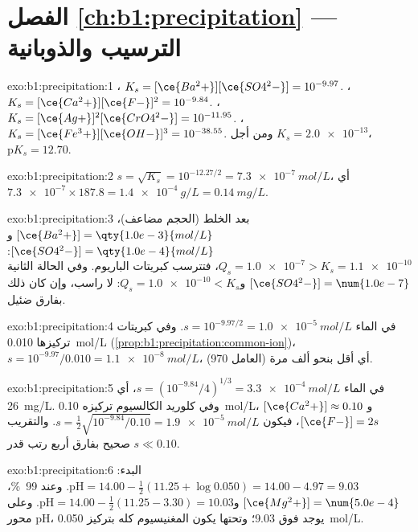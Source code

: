 \section*{الفصل \ref{ch:b1:precipitation} --- الترسيب والذوبانية}

\begin{solution}{exo:b1:precipitation:1}
، $K_s = [\ce{Ba^2+}][\ce{SO4^2-}] =
10^{-9.97}$. ، $K_s = [\ce{Ca^2+}][\ce{F-}]^2 =
10^{-9.84}$. ، $K_s =
[\ce{Ag+}]^2[\ce{CrO4^2-}] = 10^{-11.95}$. ،
$K_s = [\ce{Fe^3+}][\ce{OH-}]^3 = 10^{-38.55}$. ومن أجل $K_s = \num{2.0e-13}$،
$\mathrm{p}K_s = 12.70$.
\end{solution}

\begin{solution}{exo:b1:precipitation:2}
$s = \sqrt{K_s} = 10^{-12.27/2} = \qty{7.3e-7}{mol/L}$، أي
$\num{7.3e-7} \times 187.8 = \qty{1.4e-4}{g/L} = \qty{0.14}{mg/L}$.
\end{solution}

\begin{solution}{exo:b1:precipitation:3}
بعد الخلط (الحجم مضاعف)، $[\ce{Ba^2+}] = \qty{1.0e-3}{mol/L}$
و$[\ce{SO4^2-}] = \qty{1.0e-4}{mol/L}$: $Q_s = \num{1.0e-7} > K_s =
\num{1.1e-10}$، فتترسب كبريتات الباريوم. وفي الحالة الثانية
$[\ce{SO4^2-}] = \num{1.0e-7}$ و$Q_s = \num{1.0e-10} < K_s$: لا
راسب، وإن كان ذلك بفارق ضئيل.
\end{solution}

\begin{solution}{exo:b1:precipitation:4}
في الماء $s = 10^{-9.97/2} = \qty{1.0e-5}{mol/L}$. وفي كبريتات تركيزها \qty{0.010}{mol/L}
(\cref{prop:b1:precipitation:common-ion})، $s = 10^{-9.97}/0.010 =
\qty{1.1e-8}{mol/L}$، أي أقل بنحو ألف مرة (العامل 970).
\end{solution}

\begin{solution}{exo:b1:precipitation:5}
في الماء $s = (10^{-9.84}/4)^{1/3} = \qty{3.3e-4}{mol/L}$، أي
\qty{26}{mg/L}. وفي كلوريد الكالسيوم تركيزه \qty{0.10}{mol/L}،
$[\ce{Ca^2+}] \approx 0.10$ و$[\ce{F-}] = 2s$، فيكون
$s = \frac12\sqrt{10^{-9.84}/0.10} = \qty{1.9e-5}{mol/L}$.
والتقريب $s \ll 0.10$ صحيح بفارق أربع رتب قدر.
\end{solution}

\begin{solution}{exo:b1:precipitation:6}
البدء: $\mathrm{pH} = 14.00 - \frac12(11.25 + \log 0.050) = 14.00 - 4.97 =
9.03$. وعند \qty{99}{\percent}، $[\ce{Mg^2+}] = \num{5.0e-4}$
و$\mathrm{pH} = 14.00 - \frac12(11.25 - 3.30) = 10.03$. وعلى محور pH،
يوجد  فوق 9.03؛ وتحتها يكون المغنيسيوم كله 
بتركيز \qty{0.050}{mol/L}.
\end{solution}

